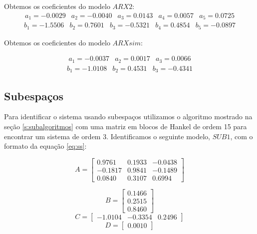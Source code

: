 Obtemos os coeficientes do modelo $ARX2$:
\begin{equation}
\begin{matrix}
a_1= -0.0029  &
a_2= -0.0040   &
a_3= 0.0143  &
a_4=  0.0057 &
a_5=  0.0725
\end{matrix}
\end{equation}
\begin{equation}
\begin{matrix}
b_1= -1.5506  &
b_2=  0.7601  &
b_3= -0.5321  &
b_4=  0.4854 &
b_5=  -0.0897
\end{matrix}
\end{equation}

Obtemos os coeficientes do modelo $ARXsim$:

\begin{equation}
\begin{matrix}
a_1= -0.0037 &
a_2=  0.0017 &
a_3=   0.0066 
\end{matrix}
\end{equation}
\begin{equation}
\begin{matrix}
b_1=-1.0108   &
b_2= 0.4531  &
b_3= -0.4341
\end{matrix}
\end{equation}


\subsection{Subespaços}\label{s:4estsub}

Para identificar o sistema usando subespaços utilizamos o algoritmo mostrado na seção \ref{s:subalgoritmos} com uma matriz em blocos de Hankel de ordem 15 para encontrar um sistema de ordem 3. Identificamos o seguinte modelo, $SUB1$, com o formato da equação \eqref{eq:ss}:

\begin{equation}
A=\begin{bmatrix}
0.9761  &  0.1933 &  -0.0438\\
-0.1817  &  0.9841  & -0.1489\\
0.0840  &  0.3107  &  0.6994
\end{bmatrix}
\end{equation}

\begin{equation}
B=\begin{bmatrix}
0.1466\\
0.2515\\
0.8460
\end{bmatrix}
\end{equation}
\begin{equation}
C=\begin{bmatrix}
-1.0104 &  -0.3354 &   0.2496
\end{bmatrix}
\end{equation}
\begin{equation}
D=\begin{bmatrix}
0.0010
\end{bmatrix}
\end{equation}


